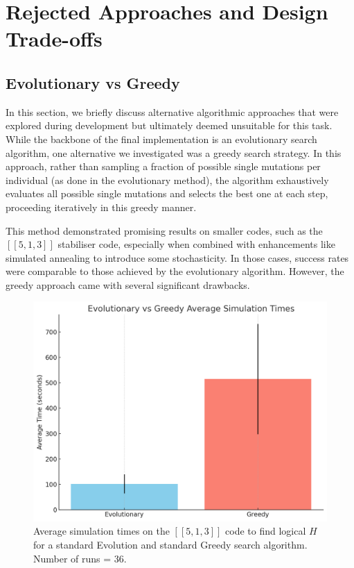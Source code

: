 \section{Rejected Approaches and Design Trade-offs}

\subsection{Evolutionary vs Greedy}
In this section, we briefly discuss alternative algorithmic approaches that were explored during development but ultimately deemed unsuitable for this task. While the backbone of the final implementation is an evolutionary search algorithm, one alternative we investigated was a greedy search strategy. In this approach, rather than sampling a fraction of possible single mutations per individual (as done in the evolutionary method), the algorithm exhaustively evaluates all possible single mutations and selects the best one at each step, proceeding iteratively in this greedy manner.

This method demonstrated promising results on smaller codes, such as the \([[5,1,3]]\) stabiliser code, especially when combined with enhancements like simulated annealing to introduce some stochasticity. In those cases, success rates were comparable to those achieved by the evolutionary algorithm. However, the greedy approach came with several significant drawbacks.

\begin{figure}[h]
    \centering
    \includegraphics[width=1\linewidth]{Logos/output-5.png}
    \caption{Average simulation times on the \([[5,1,3]]\) code to find logical \(H\) for a standard Evolution and standard Greedy search algorithm. Number of runs = 36.}
    \label{fig:Evo vs Greedy simulation times}
\end{figure}

